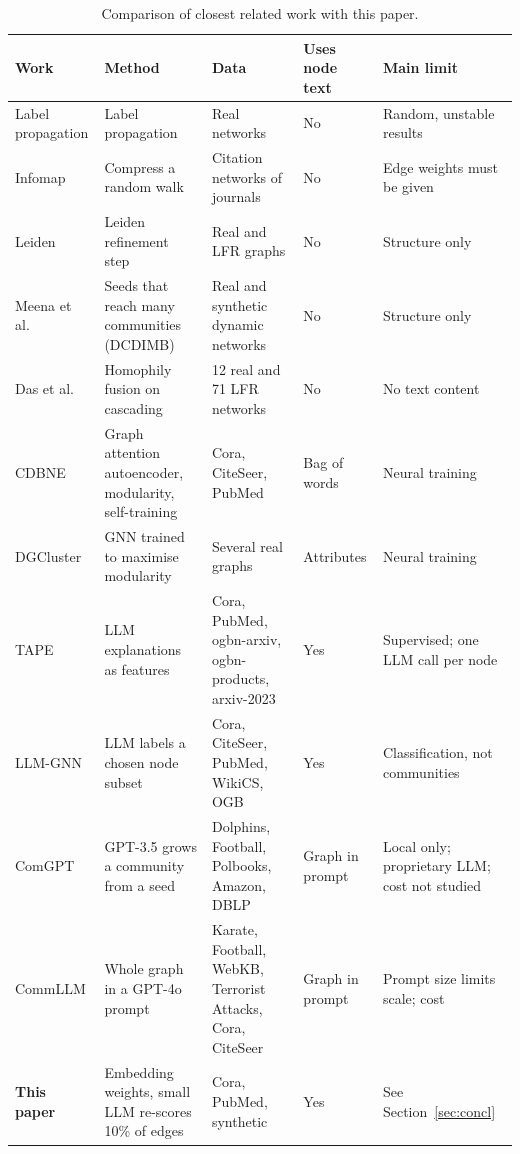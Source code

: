 \documentclass[journal]{IEEEtran}
\begin{document}
\begin{table}[!t]
\centering
\caption{Comparison of closest related work with this paper.}
\label{tab:related}
\small
\begin{tabular}{@{}p{1.6cm}p{4.2cm}p{3.6cm}p{2.9cm}p{3.3cm}@{}}
\toprule
Work & Method & Data & Uses node text & Main limit \\
\midrule
Label propagation \cite{raghavan2007} & Label propagation & Real networks & No & Random, unstable results \\
Infomap \cite{rosvall2008} & Compress a random walk & Citation networks of journals & No & Edge weights must be given \\
Leiden \cite{traag2019} & Leiden refinement step & Real and LFR graphs & No & Structure only \\
Meena et al. \cite{meena2024} & Seeds that reach many communities (DCDIMB) & Real and synthetic dynamic networks & No & Structure only \\
Das et al. \cite{das2026} & Homophily fusion on cascading & 12 real and 71 LFR networks & No & No text content \\
CDBNE \cite{zhou2023} & Graph attention autoencoder, modularity, self-training & Cora, CiteSeer, PubMed & Bag of words & Neural training \\
DGCluster \cite{bhowmick2024} & GNN trained to maximise modularity & Several real graphs & Attributes & Neural training \\
TAPE \cite{he2024} & LLM explanations as features & Cora, PubMed, ogbn-arxiv, ogbn-products, arxiv-2023 & Yes & Supervised; one LLM call per node \\
LLM-GNN \cite{chen2024llmgnn} & LLM labels a chosen node subset & Cora, CiteSeer, PubMed, WikiCS, OGB & Yes & Classification, not communities \\
ComGPT \cite{ni2026} & GPT-3.5 grows a community from a seed & Dolphins, Football, Polbooks, Amazon, DBLP & Graph in prompt & Local only; proprietary LLM; cost not studied \\
CommLLM \cite{gujral2025} & Whole graph in a GPT-4o prompt & Karate, Football, WebKB, Terrorist Attacks, Cora, CiteSeer & Graph in prompt & Prompt size limits scale; cost \\
\textbf{This paper} & Embedding weights, small LLM re-scores 10\% of edges & Cora, PubMed, synthetic & Yes & See Section~\ref{sec:concl} \\
\bottomrule
\end{tabular}
\end{table}
\end{document}
